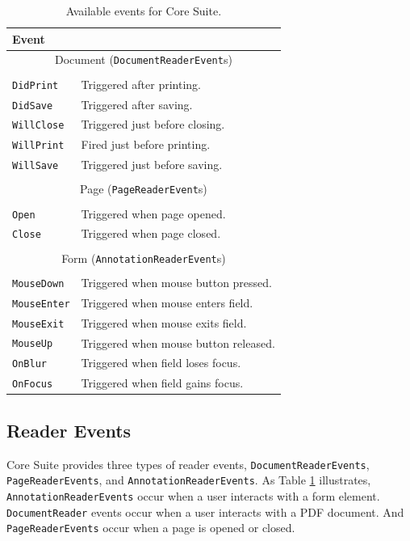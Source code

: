 \documentclass[american,letterpaper]{tufte-book}
\providecommand{\tabularnewline}{\\}
\numberwithin{equation}{section}
\numberwithin{figure}{section}
\begin{document}
{\begin{table}[h]
\begin{tabular}{ll}
\toprule 
{\small Event} & \tabularnewline
\midrule
\multicolumn{2}{c}{{\small Document (}{\small\texttt{DocumentReaderEvent}}{\small s)}}\tabularnewline
 & \tabularnewline
{\small\texttt{DidPrint}} & {\small Triggered after printing.}\tabularnewline
{\small\texttt{DidSave}} & {\small Triggered after saving.}\tabularnewline
{\small\texttt{WillClose}} & {\small Triggered just before closing.}\tabularnewline
{\small\texttt{WillPrint}} & {\small Fired just before printing.}\tabularnewline
{\small\texttt{WillSave}} & {\small Triggered just before saving.}\tabularnewline
 & \tabularnewline
\multicolumn{2}{c}{{\small Page (}{\small\texttt{PageReaderEvent}}{\small s)}}\tabularnewline
 & \tabularnewline
{\small\texttt{Open}} & {\small Triggered when page opened.}\tabularnewline
{\small\texttt{Close}} & {\small Triggered when page closed.}\tabularnewline
 & \tabularnewline
\multicolumn{2}{c}{{\small Form (}{\small\texttt{AnnotationReaderEvent}}{\small s)}}\tabularnewline
 & \tabularnewline
{\small\texttt{MouseDown}} & {\small Triggered when mouse button pressed.}\tabularnewline
{\small\texttt{MouseEnter}} & {\small Triggered when mouse enters field.}\tabularnewline
{\small\texttt{MouseExit}} & {\small Triggered when mouse exits field.}\tabularnewline
{\small\texttt{MouseUp}} & {\small Triggered when mouse button released.}\tabularnewline
{\small\texttt{OnBlur}} & {\small Triggered when field loses focus.}\tabularnewline
{\small\texttt{OnFocus}} & {\small Triggered when field gains focus.}\tabularnewline
\bottomrule
\end{tabular}\caption{Available events for Core Suite.}\label{tab:Available-events-for}

\end{table}


\subsection{Reader Events}

Core Suite provides three types of reader events, \texttt{DocumentReaderEvents},
\texttt{PageReaderEvents}, and \texttt{AnnotationReaderEvents}. As
Table \ref{tab:Available-events-for} illustrates, \texttt{AnnotationReaderEvents}
occur when a user interacts with a form element. \texttt{DocumentReader}
events occur when a user interacts with a PDF document. And \texttt{PageReaderEvents}
occur when a page is opened or closed.

}
\end{document}

